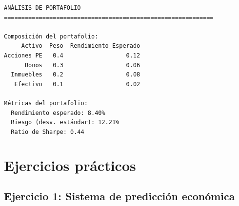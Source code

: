 \documentclass[
  doc,
  floatsintext,
  longtable,
  a4paper,
  nolmodern,
  notxfonts,
  notimes,
  12pt,
  colorlinks=true,linkcolor=blue,citecolor=blue,urlcolor=blue]{apa7}
\begin{document}
\begin{verbatim}
ANÁLISIS DE PORTAFOLIO
============================================================

Composición del portafolio:
     Activo  Peso  Rendimiento_Esperado
Acciones PE   0.4                  0.12
      Bonos   0.3                  0.06
  Inmuebles   0.2                  0.08
   Efectivo   0.1                  0.02

Métricas del portafolio:
  Rendimiento esperado: 8.40%
  Riesgo (desv. estándar): 12.21%
  Ratio de Sharpe: 0.44
\end{verbatim}

\section{Ejercicios prácticos}\label{ejercicios-pruxe1cticos}

\subsection{Ejercicio 1: Sistema de predicción
económica}\label{ejercicio-1-sistema-de-predicciuxf3n-econuxf3mica}
\end{document}
